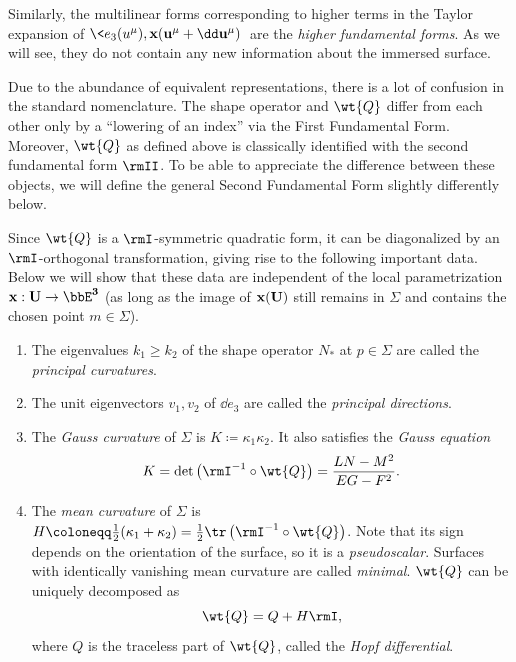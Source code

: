 Similarly, the multilinear forms corresponding to higher terms in the Taylor expansion of $\<e_3(u^\mu),\bf{x}(u^\mu+\dd u^\mu)\>$ are the \emph{higher fundamental forms}. As we will see, they do not contain any new information about the immersed surface.


\begin{rem}
    Due to the abundance of equivalent representations, there is a lot of confusion in the standard nomenclature. The shape operator and $\wt{Q}$ differ from each other only by a ``lowering of an index'' via the First Fundamental Form. Moreover, $\wt{Q}$ as defined above is classically identified with the second fundamental form $\rmII$. To be able to appreciate the difference between these objects, we will define the general Second Fundamental Form slightly differently below.
\end{rem}

Since $\wt{Q}$ is a $\rmI$-symmetric quadratic form, it can be diagonalized by an $\rmI$-orthogonal transformation, giving rise to the following important data. Below we will show that these data are independent of the local parametrization $\bf{x}:U\to \bbE^3$ (as long as the image of $\bf{x}(U)$ still remains in $\Sigma$ and contains the chosen point $m\in\Sigma$).

\begin{defn}
    \begin{enumerate}
        \item The eigenvalues $k_1\geq k_2$ of the shape operator $N_\ast$ at $p\in \Sigma$ are called the \emph{principal curvatures}.
        \item The unit eigenvectors $v_1,v_2$ of $\dd e_3$ are called the \emph{principal directions}.
        \item The \emph{Gauss curvature} of $\Sigma$ is $K\coloneqq \kappa_1\kappa_2$. It also satisfies the \emph{Gauss equation}
        \[K=\det\left(\rmI^{-1}\circ \wt{Q}\right)=\frac{LN-M^2}{EG-F^2}.\]
        \item The \emph{mean curvature} of $\Sigma$ is $H\coloneqq \frac12(\kappa_1+\kappa_2)=\frac12\tr\left(\rmI^{-1}\circ \wt{Q}\right)$. Note that its sign depends on the orientation of the surface, so it is a \emph{pseudoscalar}. Surfaces with identically vanishing mean curvature are called \emph{minimal}. $\wt{Q}$ can be uniquely decomposed as
        \[\wt{Q}=Q+H\rmI,\]
        where $Q$ is the traceless part of $\wt{Q}$, called the \emph{Hopf differential}.
    \end{enumerate}
\end{defn}


